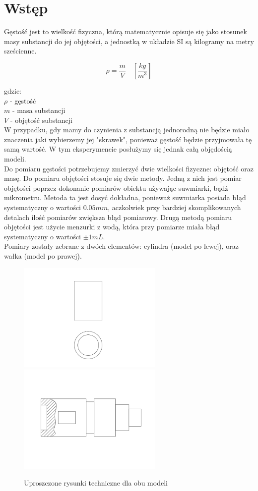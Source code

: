 {\section{Wstęp}}

Gęstość jest to wielkość fizyczna, którą matematycznie opisuje się jako stosunek masy substancji do jej objętości,
a jednostką w układzie SI są kilogramy na metry sześcienne.

$$\rho = \frac{m}{V} \quad [\frac{kg}{m^3}]$$

{\noindent \small gdzie: \\ $\rho$ - gęstość \\ $m$ - masa substancji \\ $V$ - objętość substancji } \\

W przypadku, gdy mamy do czynienia z substancją jednorodną nie będzie miało znaczenia jaki wybierzemy jej "skrawek", ponieważ gęstość będzie przyjmowała tę samą wartość.
W tym eksperymencie posłużymy się jednak całą objędością modeli. \\

Do pomiaru gęstości potrzebujemy zmierzyć dwie wielkości fizyczne: objętość oraz masę.
Do pomiaru objętości stosuje się dwie metody.
Jedną z nich jest pomiar objętości poprzez dokonanie pomiarów obiektu używając suwmiarki,
bądź mikrometru. Metoda ta jest dosyć dokładna,
ponieważ suwmiarka posiada błąd systematyczny o wartości $0.05mm$,
aczkolwiek przy bardziej skomplikowanych detalach ilość pomiarów zwiększa błąd pomiarowy.
Drugą metodą pomiaru objętości jest użycie menzurki z wodą,
która przy pomiarze miała błąd systematyczny o wartości $\pm 1mL$. \\

Pomiary zostały zebrane z dwóch elementów: cylindra (model po lewej), oraz wałka (model po prawej).

\begin{figure}[h]
    \centering
    \includegraphics[width=70mm]{imgs/rysunek_cylindra.png}
    \includegraphics[width=70mm]{imgs/rysunek_walca.png}
    \caption{Uproszczone rysunki techniczne dla obu modeli}
    \label{fig:rysunki}
\end{figure}

